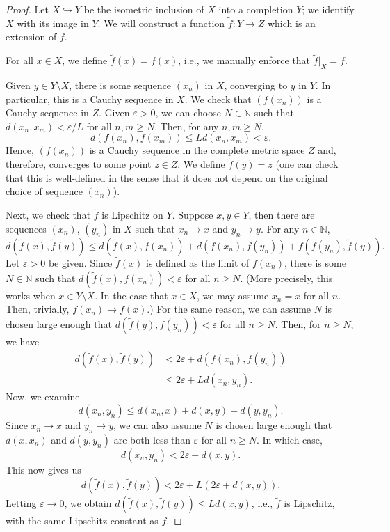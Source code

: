 \documentclass[12pt]{article}
\newcommand{\N}{\mathbb{N}}
\newcommand{\eps}{\varepsilon}
\newcommand{\<}{\langle}
\renewcommand{\>}{\rangle}
\begin{document}
\begin{proof}
    

    Let $X \hookrightarrow Y$ be the isometric inclusion of $X$ into a completion $Y$; we identify $X$ with its image in $Y$. We will construct a function $\tilde{f} : Y \to Z$ which is an extension of $f$.
    
    For all $x \in X$, we define $\tilde{f}(x) = f(x)$, i.e., we manually enforce that $\tilde{f}|_X = f$.
    
    Given $y \in Y \setminus X$, there is some sequence $(x_n)$ in $X$, converging to $y$ in $Y$. In particular, this is a Cauchy sequence in $X$. We check that $(f(x_n))$ is a Cauchy sequence in $Z$. Given $\eps > 0$, we can choose $N \in \N$ such that $d(x_n, x_m) < \eps/L$ for all $n, m \geq N$. Then, for any $n, m \geq N$,
    \[
        d(f(x_n), f(x_m))
            \leq Ld(x_n, x_m)
            < \eps.
    \]
    Hence, $(f(x_n))$ is a Cauchy sequence in the complete metric space $Z$ and, therefore, converges to some point $z \in Z$. We define $\tilde{f}(y) = z$ (one can check that this is well-defined in the sense that it does not depend on the original choice of sequence $(x_n)$). 

    Next, we check that $\tilde{f}$ is Lipschitz on $Y$. Suppose $x, y \in Y$, then there are sequences $(x_n)$, $(y_n)$ in $X$ such that $x_n \to x$ and $y_n \to y$. For any $n \in \N$,
    \[
        d(\tilde{f}(x), \tilde{f}(y))
            \leq d(\tilde{f}(x), f(x_n)) + d(f(x_n), f(y_n)) + f(f(y_n), \tilde{f}(y)).
    \]
    Let $\eps > 0$ be given. Since $\tilde{f}(x)$ is defined as the limit of $f(x_n)$, there is some $N \in \N$ such that $d(\tilde{f}(x), f(x_n)) < \eps$ for all $n \geq N$. (More precisely, this works when $x \in Y \setminus X$. In the case that $x \in X$, we may assume $x_n = x$ for all $n$. Then, trivially, $f(x_n) \to f(x)$.) For the same reason, we can assume $N$ is chosen large enough that $d(\tilde{f}(y), f(y_n)) < \eps$ for all $n \geq N$. Then, for $n \geq N$, we have
    \begin{align*}
        d(\tilde{f}(x), \tilde{f}(y))
            &< 2\eps + d(f(x_n), f(y_n)) \\
            &\leq 2\eps + Ld(x_n, y_n).
    \end{align*}
    Now, we examine
    \[
        d(x_n, y_n) \leq d(x_n, x) + d(x, y) + d(y, y_n).
    \]
    Since $x_n \to x$ and $y_n \to y$, we can also assume $N$ is chosen large enough that $d(x, x_n)$ and $d(y, y_n)$ are both less than $\eps$ for all $n \geq N$. In which case,
    \[
        d(x_n, y_n) < 2\eps + d(x, y).
    \]
    This now gives us
    \[
        d(\tilde{f}(x), \tilde{f}(y)) < 2\eps + L(2\eps + d(x, y)).
    \]
    Letting $\eps \to 0$, we obtain $d(\tilde{f}(x), \tilde{f}(y)) \leq Ld(x, y)$, i.e., $\tilde{f}$ is Lipschitz, with the same Lipschitz constant as $f$.


\end{proof}
\end{document}

